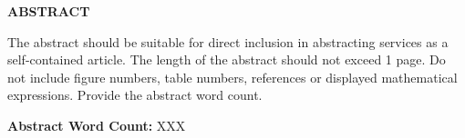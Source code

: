 \thispagestyle{plain}
\setcounter{page}{1}

\begin{center}
  {\fontsize{16}{22}\selectfont\bfseries ABSTRACT}
\end{center}

\noindent
The abstract should be suitable for direct inclusion in abstracting
services as a self-contained article. The length of the abstract
should not exceed 1 page. Do not include figure numbers, table
numbers, references or displayed mathematical expressions. Provide
the abstract word count.

\bigskip
\noindent\textbf{Abstract Word Count:} XXX

\clearpage

